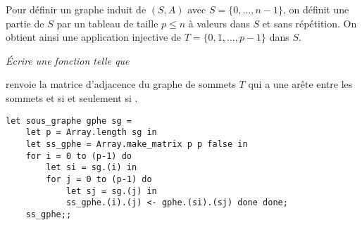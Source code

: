 Pour définir un graphe induit de $(S, A)$ avec $S= \{ 0, \dots, n-1\}$, on définit une partie de $S$ par un tableau  de taille $p\le n$ à valeurs dans $S$ et sans répétition. On obtient ainsi une application injective de $T = \{0, 1, \ldots, p-1\}$ dans  $S$.
\begin{Exercise} \it 
Écrire une fonction  telle que 

 renvoie la matrice d'adjacence du graphe de sommets $T$  qui a une arête entre les sommets  et  si et seulement si .
\end{Exercise} 
\begin{Answer}
\begin{lstlisting}
let sous_graphe gphe sg =
    let p = Array.length sg in
    let ss_gphe = Array.make_matrix p p false in
    for i = 0 to (p-1) do
        let si = sg.(i) in
        for j = 0 to (p-1) do
            let sj = sg.(j) in
            ss_gphe.(i).(j) <- gphe.(si).(sj) done done;
    ss_gphe;;
\end{lstlisting}
\end{Answer}
\newpage

